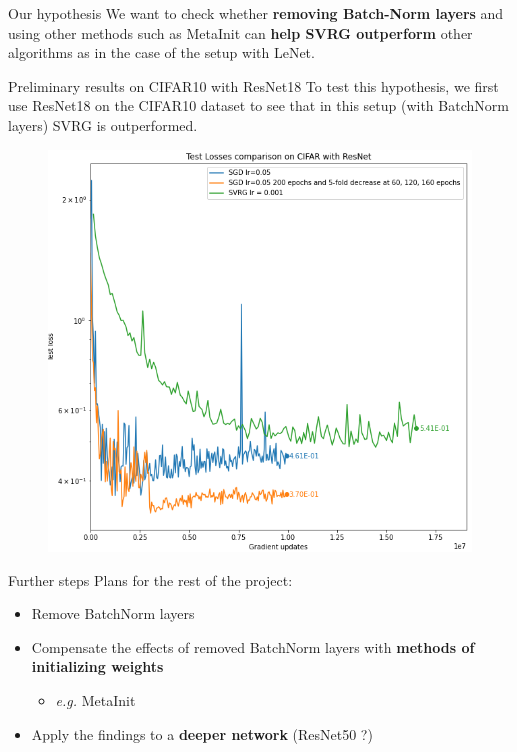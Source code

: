 \documentclass[10pt]{beamer}
\begin{document}
\begin{frame}{Our hypothesis}
    We want to check whether \textbf{removing Batch-Norm layers} and using other methods such as MetaInit can \textbf{help SVRG outperform} other algorithms as in the case of the setup with LeNet.
\end{frame}


\begin{frame}{Preliminary results on CIFAR10 with ResNet18}
    To test this hypothesis, we first use ResNet18 on the CIFAR10 dataset to see that in this setup (with BatchNorm layers) SVRG is outperformed.
    \begin{figure}
        \centering
    \includegraphics[scale=0.32]{midterm presentation/images/resnet18cifar.png}
        \label{fig:testLossesCifar}
    \end{figure}   
\end{frame}

\begin{frame}{Further steps}
    Plans for the rest of the project:
    \begin{itemize}
        \item Remove BatchNorm layers
        \item Compensate the effects of removed BatchNorm layers with \textbf{methods of initializing weights} 
        \begin{itemize}
            \item[] \textit{e.g.} MetaInit~\citep{dauphin2019metainit}
        \end{itemize}
        \item Apply the findings to a \textbf{deeper network} (ResNet50 ?)
    \end{itemize}
\end{frame}
\end{document}
